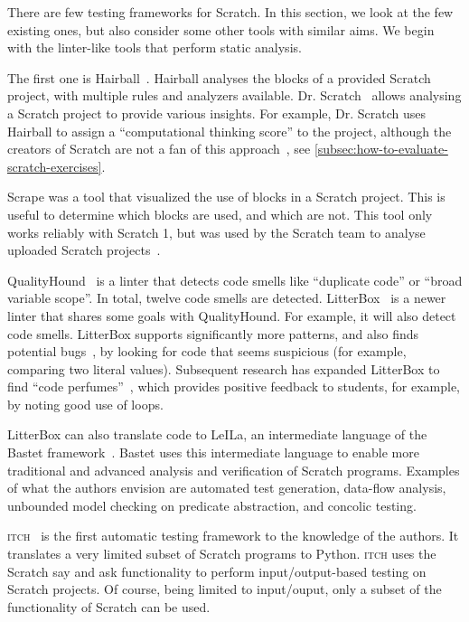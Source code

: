 \documentclass[../main]{subfiles}
\begin{document}
There are few testing frameworks for Scratch.
In this section, we look at the few existing ones, but also consider some other tools with similar aims.
We begin with the linter-like tools that perform static analysis.

The first one is Hairball~\autocite{boeHairballLintinspiredStatic2013}.
Hairball analyses the blocks of a provided Scratch project, with multiple rules and analyzers available.
Dr. Scratch~\autocite{moreno-leonDrScratchWeb2015} allows analysing a Scratch project to provide various insights.
For example, Dr. Scratch uses Hairball to assign a ``computational thinking score'' to the project, although the creators of Scratch are not a fan of this approach~\autocite{resnickCodingCrossroads2020}, see \cref{subsec:how-to-evaluate-scratch-exercises}.

Scrape was a tool that visualized the use of blocks in a Scratch project.
This is useful to determine which blocks are used, and which are not.
This tool only works reliably with Scratch 1, but was used by the Scratch team to analyse uploaded Scratch projects~\autocite{brennan2012new}.

QualityHound~\autocite{techapalokulQualityHoundOnline2017} is a linter that detects code smells like ``duplicate code'' or ``broad variable scope''.
In total, twelve code smells are detected.
LitterBox~\autocite{fraserLitterBoxLinterScratch2021} is a newer linter that shares some goals with QualityHound.
For example, it will also detect code smells.
LitterBox supports significantly more patterns, and also finds potential bugs~\autocite{fradrichCommonBugsScratch2020}, by looking for code that seems suspicious (for example, comparing two literal values).
Subsequent research has expanded LitterBox to find ``code perfumes''~\autocite{obermullerCodePerfumesReporting2021}, which provides positive feedback to students, for example, by noting good use of loops.

LitterBox can also translate code to LeILa, an intermediate language of the Bastet framework~\autocite{stahlbauerVerifiedScratchProgram2020}.
Bastet uses this intermediate language to enable more traditional and advanced analysis and verification of Scratch programs.
Examples of what the authors envision are automated test generation, data-flow analysis, unbounded model checking on predicate abstraction, and concolic testing.

\textsc{itch}~\autocite{johnsonITCHIndividualTesting2016} is the first automatic testing framework to the knowledge of the authors.
It translates a very limited subset of Scratch programs to Python.
\textsc{itch} uses the Scratch say and ask functionality to perform input/output-based testing on Scratch projects.
Of course, being limited to input/ouput, only a subset of the functionality of Scratch can be used.
\end{document}
